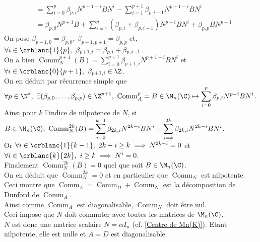 \documentclass[8pt]{book}
\begin{document}
\begin{enumerate}[leftmargin=*]
\begin{align*}
			&=\sum_{i=0}^p\beta_{p,i}N^{p+1-i}BN^i-\sum_{i=1}^{p+1}\beta_{p,i-1}N^{p+1-i}BN^i\\
			&=\beta_{p,0}N^{p+1}B+\sum_{i=1}^p(\beta_{p,i}+\beta_{p,i-1})N^{p-i}BN^i+\beta_{p,p}BN^{p+1}
		\end{align*}
		On pose $\beta_{p+1,0}=\beta_{p,0},\ \beta_{p+1,p+1}=\beta_{p,p}$ et, $\forall i\in \crblanc{1}{p},\ \beta_{p+1,i}=\beta_{p,i}+\beta_{p,i-1}$.\\
		On a bien $\operatorname{Comm}_N^{p+1}(B)=\displaystyle\sum_{i=0}^{p+1}\beta_{p+1,i}N^{p+1-i}BN^i$ et $\forall i\in \crblanc{0}{p+1},\ \beta_{p+1,i}\in \Z$.\\
		On en déduit par récurrence simple que $\forall p\in \N^*,\ \exists (\beta_{p,0},\dots,\beta_{p,p})\in \Z^{p+1},\ \operatorname{Comm}_A^p=B\in \M_n(\C)\mapsto \displaystyle\sum_{i=0}^{p}\beta_{p,i}N^{p-i}BN^i$.\\
		Ainsi pour $k$ l'indice de nilpotence de $N$, si $B\in \M_n(\C),\ \operatorname{Comm}_N^{2k}(B)=\displaystyle\sum_{i=0}^{k-1}\beta_{2k,i}N^{2k-i}BN^i+\sum_{i=k}^{2k}\beta_{2k,i}N^{2k-i}BN^i$.\\
		Or $\forall i\in \crblanc{1}{k-1},\ 2k-i\geq k\implies N^{2k-i}=0$ et $\forall i\in \crblanc{k}{2k},\ i\geq k\implies N^i=0$.\\
		Finalement $\operatorname{Comm}_N^{2k}(B)=0$ quel que soit $B\in \M_n(\C)$.\\
		On en déduit que $\operatorname{Comm}_N^{2k}=0$ et en particulier que $\operatorname{Comm}_N$ est nilpotente.\\
		Ceci montre que $\operatorname{Comm}_A=\operatorname{Comm}_D+\operatorname{Comm}_N$ est la décomposition de Dunford de $\operatorname{Comm}_A$.\\
		Ainsi comme $\operatorname{Comm}_A$ est diagonalisable, $\operatorname{Comm}_N$ doit être nul.\\
		Ceci impose que $N$ doit commuter avec toutes les matrices de $\M_n(\C)$.\\
		$N$ est donc une matrice scalaire $N=\alpha I_n$ (cf. \ref{Centre de Mn(K)}). Etant nilpotente, elle est nulle et $A=D$ est diagonalisable.
	\end{enumerate}
	
\end{document}

